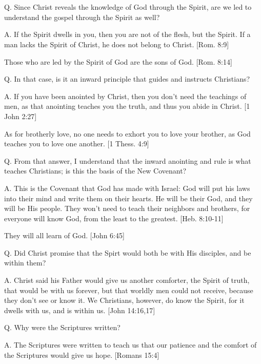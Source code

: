\documentclass[../main.tex]{subfiles}
\begin{document}
	

	\section*{}
	Q. Since Christ reveals the knowledge of God through the Spirit, are we led to understand the gospel through the Spirit as well?
	
	A. If the Spirit dwells in you, then you are not of the flesh, but the Spirit. If a man lacks the Spirit of Christ, he does not belong to Christ. [Rom. 8:9]
	
	Those who are led by the Spirit of God are the sons of God. [Rom. 8:14]
	
	Q. In that case, is it an inward principle that guides and instructs Christians?
	
	A. If you have been anointed by Christ, then you don't need the teachings of men, as that anointing teaches you the truth, and thus you abide in Christ. [1 John 2:27]
	
	As for brotherly love, no one needs to exhort you to love your brother, as God teaches you to love one another. [1 Thess. 4:9]
	
	Q. From that answer, I understand that the inward anointing and rule is what teaches Christians; is this the basis of the New Covenant?
	
	A. This is the Covenant that God has made with Israel: God will put his laws into their mind and write them on their hearts. He will be their God, and they will be His people. They won't need to teach their neighbors and brothers, for everyone will know God, from the least to the greatest. [Heb. 8:10-11] 
	
	They will all learn of God. [John 6:45]
	
	Q. Did Christ promise that the Spirt would both be with His disciples, and be within them?
	
	A. Christ said his Father would give us another comforter, the Spirit of truth, that would be with us forever, but that worldly men could not receive, because they don't see or know it. We Christians, however, do know the Spirit, for it dwells with us, and is within us. [John 14:16,17]
	
	Q. Why were the Scriptures written?
	
	A. The Scriptures were written to teach us that our patience and the comfort of the Scriptures would give us hope. [Romans 15:4]
	
\end{document}
